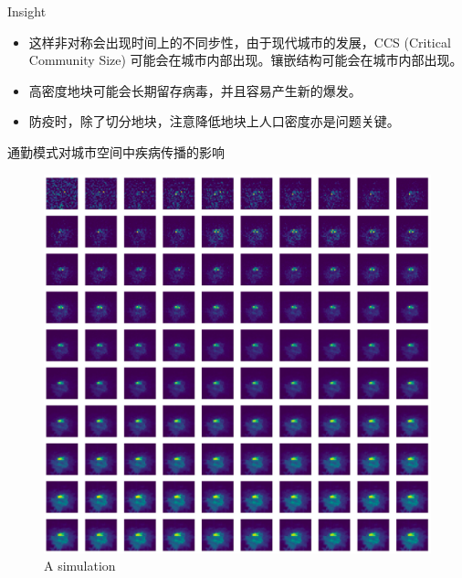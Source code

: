 \begin{frame}{Insight}
    \begin{itemize}
        \item 这样非对称会出现时间上的不同步性，由于现代城市的发展，CCS (Critical Community Size) 可能会在城市内部出现。镶嵌结构可能会在城市内部出现。
        \item 高密度地块可能会长期留存病毒，并且容易产生新的爆发。
        \item 防疫时，除了切分地块，注意降低地块上人口密度亦是问题关键。
    \end{itemize}
    
\end{frame}

\begin{frame}{通勤模式对城市空间中疾病传播的影响}
    \begin{figure}
        \centering
        \includegraphics[width = 0.5\linewidth]{pics/simu.png}
        \caption{A simulation}
    \end{figure}
\end{frame}
